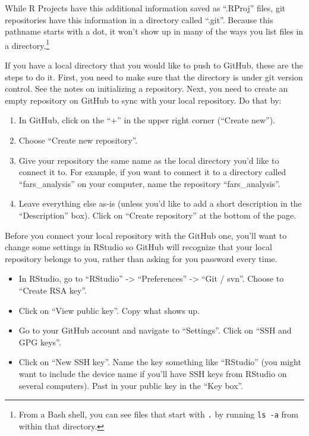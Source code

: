 \documentclass[]{tufte-book}
\providecommand{\tightlist}{%
  \setlength{\itemsep}{0pt}\setlength{\parskip}{0pt}}
\begin{document}
While R Projects have this additional information saved as ``.RProj'' files, git
repositories have this information in a directory called ``.git''. Because this
pathname starts with a dot, it won't show up in many of the ways you list files
in a directory.\footnote{From a Bash shell, you can see files that start with \texttt{.} by running
  \texttt{ls\ -a} from within that directory.}

If you have a local directory that you would like to push to GitHub, these are
the steps to do it. First, you need to make sure that the directory is under git
version control. See the notes on initializing a repository. Next, you need to
create an empty repository on GitHub to sync with your local repository. Do that
by:

\begin{enumerate}
\def\labelenumi{\arabic{enumi}.}
\tightlist
\item
  In GitHub, click on the ``+'' in the upper right corner (``Create new'').
\item
  Choose ``Create new repository''.
\item
  Give your repository the same name as the local directory you'd like to
  connect it to. For example, if you want to connect it to a directory called
  ``fars\_analysis'' on your computer, name the repository ``fars\_analysis''.
\item
  Leave everything else as-is (unless you'd like to add a short description in
  the ``Description'' box). Click on ``Create repository'' at the bottom of the page.
\end{enumerate}

Before you connect your local repository with the GitHub one, you'll want to change
some settings in RStudio so GitHub will recognize that your local repository
belongs to you, rather than asking for you password every time.

\begin{itemize}
\tightlist
\item
  In RStudio, go to ``RStudio'' -\textgreater{} ``Preferences'' -\textgreater{} ``Git / svn''. Choose to ``Create
  RSA key''.
\item
  Click on ``View public key''. Copy what shows up.
\item
  Go to your GitHub account and navigate to ``Settings''. Click on ``SSH and GPG keys''.
\item
  Click on ``New SSH key''. Name the key something like ``RStudio'' (you might want
  to include the device name if you'll have SSH keys from RStudio on several
  computers). Past in your public key in the ``Key box''.
\end{itemize}
\end{document}
